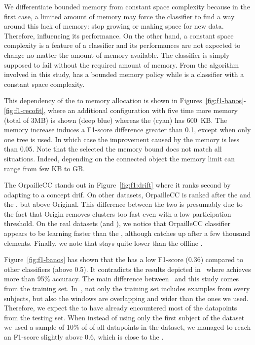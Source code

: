 We differentiate bounded memory from constant space complexity because in the
first case, a limited amount of memory may force the classifier to find a way
around this lack of memory: stop growing or making space for new data.
Therefore, influencing its performance.  On the other hand, a constant space
complexity is a feature of a classifier and its performances are not expected
to change no  matter the amount of memory available. The classifier is simply
supposed to fail without the required amount of memory. From the algorithm
involved in this study, \mondrianforest has a bounded memory policy while
\naivebayes is a classifier with a constant space complexity.

This dependency of the \mondrianforest to memory allocation is shown in
Figures~\ref{fig:f1-banos}-\ref{fig:f1-recofit}, where an additional
configuration with five time more memory (total of 3MB) is shown (deep blue)
whereas the \mondrianforest (cyan) has 600~KB.  The memory increase induces a
F1-score difference greater than 0.1, except when only one tree is used. In
which case the improvement caused by the memory is less than 0.05. Note that the
selected the memory bound does not match all situations. Indeed, depending on
the connected object the memory limit can range from few KB to GB.

The \mcnn OrpailleCC stands out in Figure~\ref{fig:f1:drift} where it ranks
second by adapting to a concept drif.  On other datasets, \mcnn OrpailleCC is
ranked after the \mondrianforest and the \hoeffdingtree, but above \mcnn
Original. This difference between the two \mcnns is presumably due to the fact
that \mcnn Origin removes clusters too fast even with a low participation
threshold.  On the real datasets (\banosdataset and \recofitdataset), we notice
that \mcnn OrpailleCC classifier appears to be learning faster than the
\mondrianforest, although \mondrianforest catches up after a few thousand
elements. Finally, we note that \mcnn stays quite lower than the offline \knn.

Figure~\ref{fig:f1-banos} has shown that the \FNN has a low F1-score (0.36)
compared to other classifiers (above 0.5). It contradicts the results depicted
in~\cite{omid_2019} where \FNN achieves more than 95\% accuracy. The main
difference between~\cite{omid_2019} and this study comes from the training set.
In~\cite{omid_2019}, not only the training set includes examples from every
subjects, but also the windows are overlapping and wider than the ones we used.
Therefore, we expect the \FNN to have already encountered most of the datapoints
from the testing set. When instead of using only the first subject of the
\banosdataset dataset we used a sample of 10\% of of all datapoints in the
\banosdataset dataset, we managed to reach an F1-score slightly above 0.6, which
is close to the \naivebayes.

